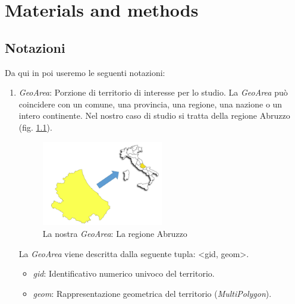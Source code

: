 \chapter{Materials and methods } %

\label{ch:materialandmethods} %


\section{Notazioni}
\label{notazioni}
Da qui in poi useremo le seguenti notazioni:
\begin{enumerate}


\item \textit{GeoArea}: Porzione di territorio di interesse per lo studio. La \textit{GeoArea} può coincidere con un comune, una provincia, una regione, una nazione o un intero continente. Nel nostro caso di studio si tratta della regione Abruzzo (fig. \ref{fig:abruzzo}).
\begin{figure}[h]
	\centering		\includegraphics[width=0.5\textwidth]{img/abruzzo}
	\caption{La nostra \textit{GeoArea}: La regione Abruzzo}
    	\label{fig:abruzzo}
\end{figure}

La \textit{GeoArea} viene descritta dalla seguente tupla: <gid, geom>.
\begin{itemize}
\item \textit{gid}: Identificativo numerico univoco del territorio.
\item \textit{geom}: Rappresentazione geometrica del territorio (\textit{MultiPolygon}).
\end{itemize}


\end{enumerate}
